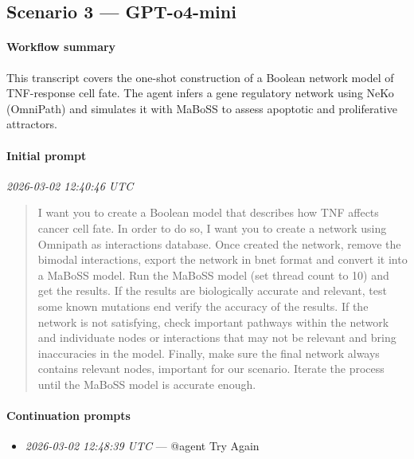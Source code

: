 \subsection{Scenario 3 — GPT-o4-mini}

\paragraph{Workflow summary}
This transcript covers the one-shot construction of a Boolean network model of TNF-response cell fate. The agent infers a gene regulatory network using NeKo (OmniPath) and simulates it with MaBoSS to assess apoptotic and proliferative attractors.

\paragraph{Initial prompt} \hfill \textit{\small 2026-03-02 12:40:46 UTC}
\begin{quote}
I want you to create a Boolean model that describes how TNF affects cancer cell fate. In order to do so, I want you to create a network using Omnipath as interactions database.
Once created the network, remove the bimodal interactions, export the network in bnet format and convert it into a MaBoSS model. Run the MaBoSS model (set thread count to 10) and get the results. If the results are biologically accurate and relevant, test some known mutations end verify the accuracy of the results. If the network is not satisfying, check important pathways within the network and individuate nodes or interactions that may not be relevant and bring inaccuracies in the model. Finally, make sure the final network always contains relevant nodes, important for our scenario.
Iterate the process until the MaBoSS model is accurate enough.
\end{quote}

\paragraph{Continuation prompts}
\begin{itemize}
\item \textit{\small 2026-03-02 12:48:39 UTC} --- @agent Try Again
\end{itemize}

